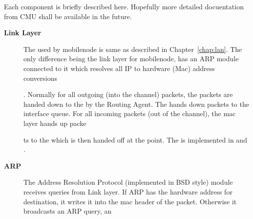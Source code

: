 Each component is briefly described here. Hopefully more detailed docuentation from CMU shall be available in the future.
\begin{description}
\item[{\bf Link Layer}] The  used by mobilenode is same as described in Chapter~\ref{chap:lan}. The only difference being the link layer for mobilenode, has an ARP module connected to it which resolves all IP to hardware (Mac) address conversions






















. Normally for all outgoing (into the channel) packets, the packets are handed down to the  by the Routing Agent. The  hands down packets to the interface queue. For all incoming packets (out of the channel), the mac layer hands up packe






















ts to the  which is then handed off at the  point. The  is implemented in  and .

\item [{\bf ARP}] The Address Resolution Protocol (implemented in BSD style) module receives queries from Link layer. If ARP has the hardware address for destination, it writes it into the mac header of the packet. Otherwise it broadcasts an ARP query, an























\end{description}
